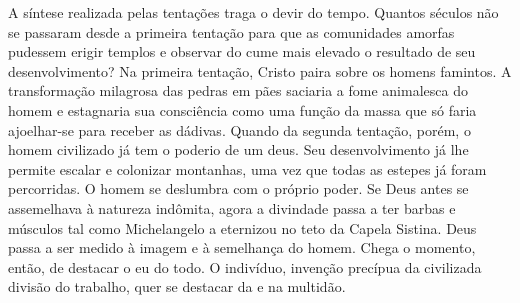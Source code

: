 A síntese realizada pelas tentações traga o devir do tempo. Quantos
séculos não se passaram desde a primeira tentação para que as
comunidades amorfas pudessem erigir templos e observar do cume mais
elevado o resultado de seu desenvolvimento? Na primeira tentação, Cristo
paira sobre os homens famintos. A transformação milagrosa das pedras em
pães saciaria a fome animalesca do homem e estagnaria sua consciência
como uma função da massa que só faria ajoelhar-se para receber as
dádivas. Quando da segunda tentação, porém, o homem civilizado já tem o
poderio de um deus. Seu desenvolvimento já lhe permite escalar e
colonizar montanhas, uma vez que todas as estepes já foram percorridas.
O homem se deslumbra com o próprio poder. Se Deus antes se assemelhava à
natureza indômita, agora a divindade passa a ter barbas e músculos tal
como Michelangelo a eternizou no teto da Capela Sistina. Deus passa a
ser medido à imagem e à semelhança do homem. Chega o momento, então, de
destacar o eu do todo. O indivíduo, invenção precípua da civilizada
divisão do trabalho, quer se destacar da e na multidão.

